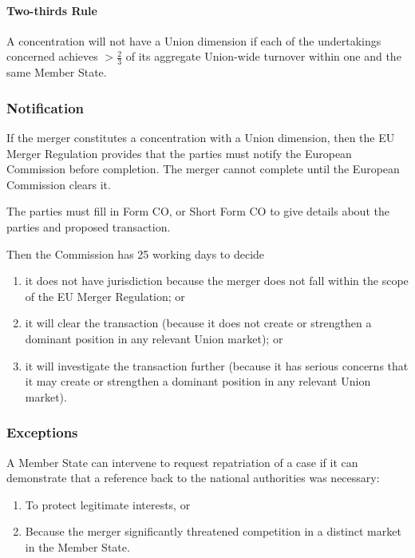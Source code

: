 \documentclass[
]{article}
\providecommand{\tightlist}{%
  \setlength{\itemsep}{0pt}\setlength{\parskip}{0pt}}
\begin{document}
\hypertarget{two-thirds-rule}{%
\paragraph{Two-thirds Rule}\label{two-thirds-rule}}

A concentration will not have a Union dimension if each of the
undertakings concerned achieves {\(> \frac{2}{3}\)} of its aggregate
Union-wide turnover within one and the same Member State.

\hypertarget{notification}{%
\subsubsection{Notification}\label{notification}}

If the merger constitutes a concentration with a Union dimension, then
the EU Merger Regulation provides that the parties must notify the
European Commission before completion. The merger cannot complete until
the European Commission clears it.

The parties must fill in Form CO, or Short Form CO to give details about
the parties and proposed transaction.

Then the Commission has 25 working days to decide

\begin{enumerate}
\tightlist
\item
  it does not have jurisdiction because the merger does not fall within
  the scope of the EU Merger Regulation; or
\item
  it will clear the transaction (because it does not create or
  strengthen a dominant position in any relevant Union market); or
\item
  it will investigate the transaction further (because it has serious
  concerns that it may create or strengthen a dominant position in any
  relevant Union market).
\end{enumerate}

\hypertarget{exceptions}{%
\subsubsection{Exceptions}\label{exceptions}}

A Member State can intervene to request repatriation of a case if it can
demonstrate that a reference back to the national authorities was
necessary:

\begin{enumerate}
\tightlist
\item
  To protect legitimate interests, or
\item
  Because the merger significantly threatened competition in a distinct
  market in the Member State.
\end{enumerate}
\end{document}
